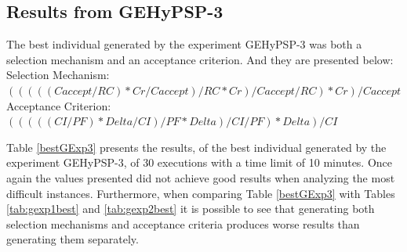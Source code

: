 \documentclass[conference]{IEEEtran}
\begin{document}
\begin{table}[]
	\centering
	\caption{Results from the best individual found in GEHyPSP-2
		}
	\label{tab:gexp2best}
\end{table}

\subsection{Results from GEHyPSP-3}

The best individual generated by the experiment GEHyPSP-3 was both a selection mechanism and an acceptance criterion. And they are presented below: \\ 
Selection Mechanism: $( ( ( ( ( Caccept / RC ) * Cr / Caccept ) / RC * Cr ) / Caccept / RC ) * Cr ) / Caccept$ \\
Acceptance Criterion: $( ( ( ( ( CI / PF ) * Delta / CI ) / PF * Delta ) / CI / PF ) * Delta ) / CI$

Table \ref{bestGExp3} presents the results, of the best individual generated by the experiment GEHyPSP-3, of 30 executions with a time limit of 10 minutes. Once again the values presented did not achieve good results when analyzing the most difficult instances. Furthermore, when comparing Table \ref{bestGExp3} with Tables \ref{tab:gexp1best} and \ref{tab:gexp2best} it is possible to see that generating both selection mechanisms and acceptance criteria produces worse results than generating them separately.
\end{document}
